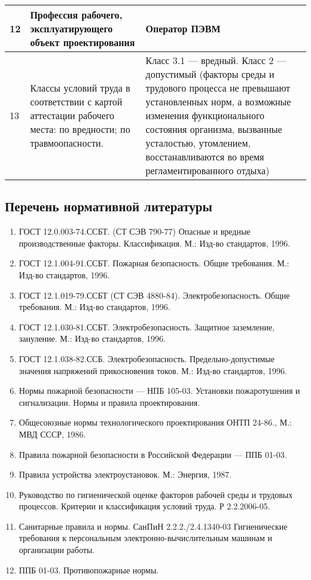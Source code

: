 \begin{longtable}[h]{|p{}|p{}|p{}|}
    12 &
    Профессия рабочего, эксплуатирующего объект проектирования &
    Оператор ПЭВМ
  \\ \hline
    13 &
    Классы условий труда в соответствии с картой аттестации рабочего места:\newline
    по вредности;\newline
    по травмоопасности. &
    Класс 3.1 --- вредный.\newline
    Класс 2 --- допустимый (факторы среды и трудового процесса не превышают установленных норм, а возможные изменения функционального состояния организма, вызванные усталостью, утомлением, восстанавливаются во время регламентированного отдыха)
  \\ \hline
\end{longtable}
\vspace{1cm}


\subsection{Перечень нормативной литературы}

\begin{enumerate}
  \item{ГОСТ 12.0.003-74.ССБТ. (СТ СЭВ 790-77) Опасные и вредные производственные факторы. Классификация. М.: Изд-во стандартов, 1996.}
  \item{ГОСТ 12.1.004-91.ССБТ. Пожарная безопасность. Общие требования. М.: Изд-во стандартов, 1996.}
  \item{ГОСТ 12.1.019-79.ССБТ (СТ СЭВ 4880-84). Электробезопасность. Общие требования. М.: Изд-во стандартов, 1996.}
  \item{ГОСТ 12.1.030-81.ССБТ. Электробезопасность. Защитное заземление, зануление. М.: Изд-во стандартов, 1996.}
  \item{ГОСТ 12.1.038-82.ССБ. Электробезопасность. Предельно-допустимые значения напряжений прикосновения токов. М.: Изд-во стандартов, 1996.}
  \item{Нормы пожарной безопасности --- НПБ 105-03. Установки пожаротушения и сигнализации. Нормы и правила проектирования.}
  \item{Общесоюзные нормы технологического проектирования ОНТП 24-86., М.: МВД СССР, 1986.}
  \item{Правила пожарной безопасности в Российской Федерации --- ППБ 01-03.}
  \item{Правила устройства электроустановок. М.: Энергия, 1987.}
  \item{Руководство по гигиенической оценке факторов рабочей среды и трудовых процессов. Критерии и классификация условий труда. Р 2.2.2006-05.}
  \item{Санитарные правила и нормы. СанПиН 2.2.2./2.4.1340-03 Гигиенические требования к персональным электронно-вычислительным машинам и организации работы.}
  \item{ППБ 01-03. Противопожарные нормы.}
\end{enumerate}

